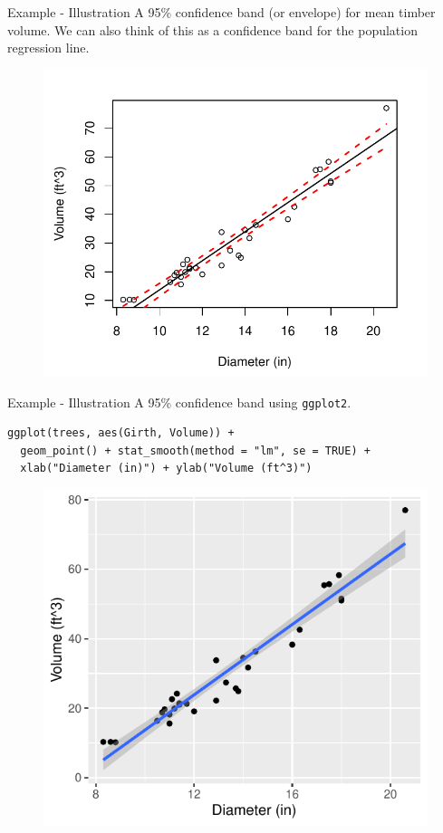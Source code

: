 \documentclass[10pt]{beamer}
\begin{document}
\begin{frame}{Example - Illustration}
A 95\% confidence band (or envelope) for mean timber volume.  We can also think of this as a confidence band for the population regression line.
\begin{figure}
\includegraphics[scale=0.65]{figure/scatter5.pdf}
\end{figure}
\end{frame}

\begin{frame}[fragile]{Example - Illustration}
A 95\% confidence band using \texttt{ggplot2}.
\begin{verbatim}
ggplot(trees, aes(Girth, Volume)) +
  geom_point() + stat_smooth(method = "lm", se = TRUE) +
  xlab("Diameter (in)") + ylab("Volume (ft^3)")
\end{verbatim}
\begin{figure}
\includegraphics[scale=0.55]{figure/ggplot_ci.pdf}
\end{figure}
\end{frame}
\end{document}
